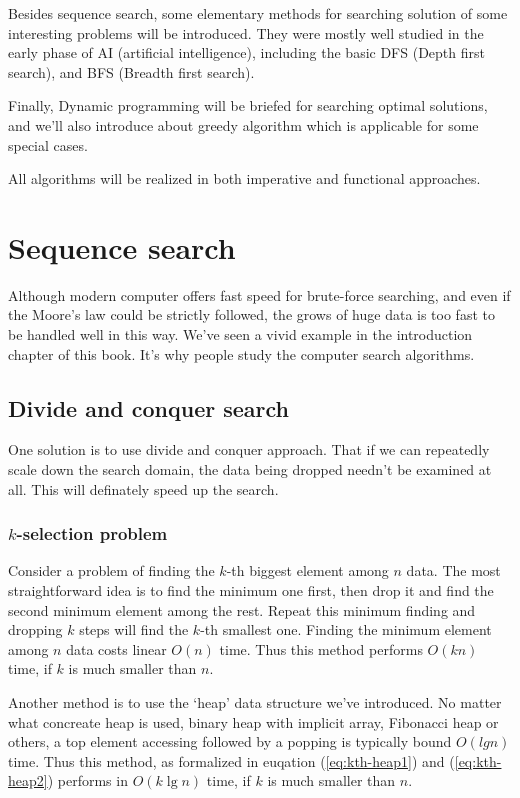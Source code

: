 \documentclass{article}
\begin{document}
Besides sequence search, some elementary methods for searching
solution of some interesting problems will be introduced. They
were mostly well studied in the early phase of AI (artificial
intelligence), including the basic DFS (Depth first search), 
and BFS (Breadth first search).

Finally, Dynamic programming will be briefed for searching
optimal solutions, and we'll also introduce about greedy
algorithm which is applicable for some special cases.

All algorithms will be realized in both imperative and functional
approaches.

\section{Sequence search}
Although modern computer offers fast speed for brute-force searching,
and even if the Moore's law could be strictly followed, the grows of
huge data is too fast to be handled well in this way. We've seen
a vivid example in the introduction chapter of this book.
It's why people study the computer search algorithms. 

\subsection{Divide and conquer search}
One solution is to use divide and conquer approach. That if we can
repeatedly scale down the search domain, the data being dropped needn't
be examined at all. This will definately speed up the search.

\subsubsection{$k$-selection problem}
Consider a problem of finding the $k$-th biggest element among $n$ data.
The most straightforward idea is to find the minimum one first, then
drop it and find the second minimum element among the rest. Repeat
this minimum finding and dropping $k$ steps will find the
$k$-th smallest one. Finding the minimum element among $n$ data
costs linear $O(n)$ time. Thus this method performs $O(kn)$ time,
if $k$ is much smaller than $n$.

Another method is to use the `heap' data structure we've introduced.
No matter what concreate heap is used, binary heap with implicit array,
Fibonacci heap or others, a top element accessing followed by a 
popping is typically bound $O(lg n)$ time. Thus this method, as
formalized in euqation (\ref{eq:kth-heap1}) and (\ref{eq:kth-heap2}) performs in $O(k \lg n)$ time, if
$k$ is much smaller than $n$.
    
\end{document}
